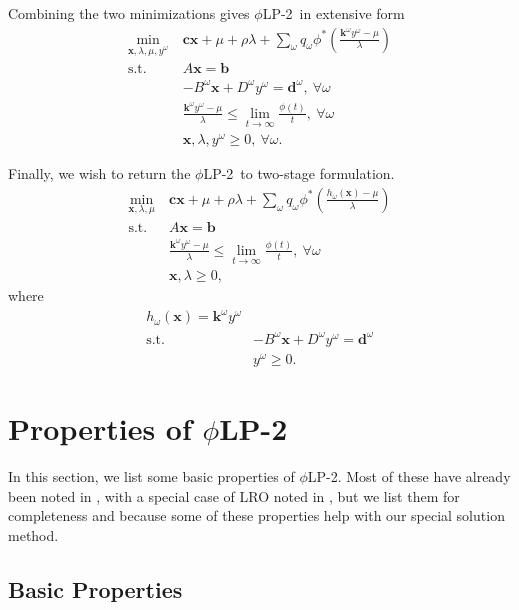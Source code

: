 \documentclass[ijoc,nonblindrev]{informs3} %
\newcommand{\x}{\mathbf{x}}
\renewcommand{\c}{\mathbf{c}}
\renewcommand{\k}{\mathbf{k}}
\renewcommand{\b}{\mathbf{b}}
\renewcommand{\d}{\mathbf{d}}
\newcommand{\st}{\mbox{s.t.}}
\newcommand{\plp}{$\phi$LP-2}
\begin{document}
Combining the two minimizations gives \plp\ in extensive form
\begin{align}
	\min_{\x,\lambda,\mu,y^\omega} \ & \c\x + \mu + \rho \lambda + \sum_\omega q_\omega \phi^*\left(\frac{\k^\omega y^\omega - \mu}{\lambda}\right) \nonumber \\
	\st \ & A\x = \b \nonumber \\
	& -B^\omega \x + D^\omega y^\omega = \d^\omega,\ \forall \omega \label{eq:plp_det_equiv} \\
	& \frac{\k^\omega y^\omega - \mu}{\lambda} \leq \lim_{t \rightarrow \infty} \frac{\phi(t)}{t}, \ \forall \omega \nonumber \\
	& \x,\lambda,y^\omega \geq 0, \ \forall \omega. \nonumber
\end{align}

Finally, we wish to return the \plp\ to two-stage formulation.
\begin{align}
	\min_{\x,\lambda,\mu} \ & \c\x + \mu + \rho \lambda + \sum_\omega q_\omega \phi^*\left(\frac{h_\omega(\x) - \mu}{\lambda}\right) \nonumber \\
	\st \ & A\x = \b \label{eq:plp_two_stage} \\
	& \frac{\k^\omega y^\omega - \mu}{\lambda} \leq \lim_{t \rightarrow \infty} \frac{\phi(t)}{t}, \ \forall \omega \label{eq:plp_feas_constraint}\\
	& \x,\lambda \geq 0, \nonumber
\end{align}
where
\begin{align}
	h_\omega(\x) = \k^\omega y^\omega \label{eq:plp_second_stage} \\
	\st \ & -B^\omega \x + D^\omega y^\omega = \d^\omega \nonumber \\
	& y^\omega \geq 0. \nonumber
\end{align}

\section{Properties of \plp}
\label{sec:properties}

In this section, we list some basic properties of \plp.
Most of these have already been noted in \cite{bental2011robust}, with a special case of LRO noted in \cite{wang2010likelihood}, but we list them for completeness and because some of these properties help with our special solution method.

\subsection{Basic Properties}
\end{document}
